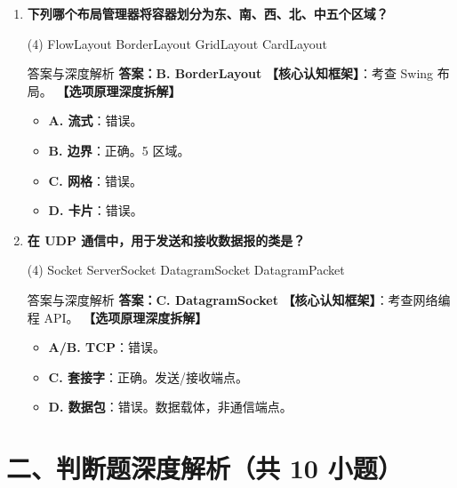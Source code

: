 ﻿\documentclass[12pt, a4paper]{ctexart}
\begin{document}
\begin{enumerate}[label=\textbf{\arabic*.}, itemsep=1em]
	\item \textbf{下列哪个布局管理器将容器划分为东、南、西、北、中五个区域？}
	      \begin{tasks}(4)
		      \task FlowLayout \task BorderLayout \task GridLayout \task CardLayout
	      \end{tasks}
	      \begin{bluebox}{答案与深度解析}
		      \textbf{答案：B. BorderLayout}
		      \textbf{【核心认知框架】}：考查 Swing 布局。
		      \textbf{【选项原理深度拆解】}
		      \begin{itemize}[leftmargin=*, nosep]
			      \item \textbf{A. 流式}：错误。
			      \item \textbf{B. 边界}：正确。5 区域。
			      \item \textbf{C. 网格}：错误。
			      \item \textbf{D. 卡片}：错误。
		      \end{itemize}
	      \end{bluebox}

	\item \textbf{在 UDP 通信中，用于发送和接收数据报的类是？}
	      \begin{tasks}(4)
		      \task Socket \task ServerSocket \task DatagramSocket \task DatagramPacket
	      \end{tasks}
	      \begin{bluebox}{答案与深度解析}
		      \textbf{答案：C. DatagramSocket}
		      \textbf{【核心认知框架】}：考查网络编程 API。
		      \textbf{【选项原理深度拆解】}
		      \begin{itemize}[leftmargin=*, nosep]
			      \item \textbf{A/B. TCP}：错误。
			      \item \textbf{C. 套接字}：正确。发送/接收端点。
			      \item \textbf{D. 数据包}：错误。数据载体，非通信端点。
		      \end{itemize}
	      \end{bluebox}
\end{enumerate}

\section*{二、判断题深度解析（共 10 小题）}
\end{document}
